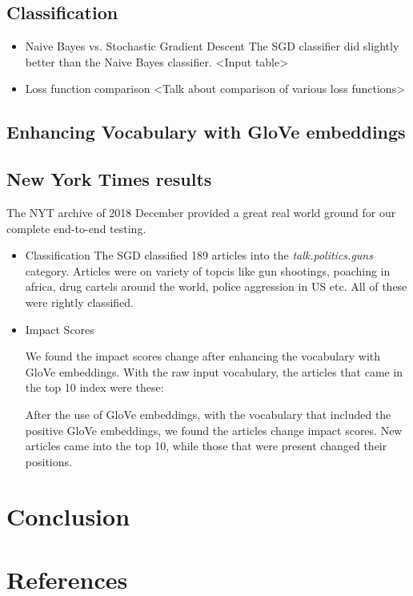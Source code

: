 \documentclass[paper=a4, fontsize=11pt]{scrartcl}
\numberwithin{equation}{section}		%
\numberwithin{figure}{section}			%
\numberwithin{table}{section}				%
\begin{document}
\subsection {Classification}

\begin {itemize}

\item {Naive Bayes vs. Stochastic Gradient Descent}
The SGD classifier did slightly better than the Naive Bayes classifier. <Input table>

\item {Loss function comparison}
<Talk about comparison of various loss functions>

\end {itemize}

\subsection {Enhancing Vocabulary with GloVe embeddings}

\subsection {New York Times results}

The NYT archive of 2018 December provided a great real world ground for our complete end-to-end testing.

\begin {itemize}
\item {Classification} The SGD classified 189 articles into the \textit{talk.politics.guns} category. Articles were on variety of topcis like gun shootings, poaching in africa, drug cartels around the world, police aggression in US etc. All of these were rightly classified.

\item {Impact Scores}
\par We found the impact scores change after enhancing the vocabulary with GloVe embeddings. With the raw input vocabulary, the articles that came in the top 10 index were these:

\par After the use of GloVe embeddings, with the vocabulary that included the positive GloVe embeddings, we found the articles change impact scores. New articles came into the top 10, while those that were present changed their positions.

\end{itemize}

\section{Conclusion}
\section{References}


\end{document}
